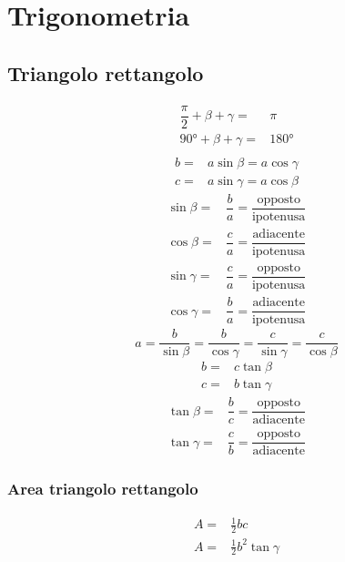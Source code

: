\chapter{Trigonometria}
\section{Triangolo rettangolo}
\begin{center}
	
\end{center}
\begin{align*}
\dfrac{\pi}{2}+\beta+\gamma=&\pi\\
\ang{90}+\beta+\gamma=&\ang{180}\\
\end{align*}
\begin{align*}
b=&a\sin\beta=a\cos\gamma\\
c=&a\sin\gamma=a\cos\beta
\end{align*}
\begin{align*}
\sin\beta=&\dfrac{b}{a}=\dfrac{\text{opposto}}{\text{ipotenusa}}\\
\cos\beta=&\dfrac{c}{a}=\dfrac{\text{adiacente}}{\text{ipotenusa}}\\
\sin\gamma=&\dfrac{c}{a}=\dfrac{\text{opposto}}{\text{ipotenusa}}\\
\cos\gamma=&\dfrac{b}{a}=\dfrac{\text{adiacente}}{\text{ipotenusa}}
\end{align*}
\begin{equation*}
a=\dfrac{b}{\sin\beta}=\dfrac{b}{\cos\gamma}=\dfrac{c}{\sin\gamma}=\dfrac{c}{\cos\beta}
\end{equation*}
\begin{align*}
b=&c\tan\beta\\
c=&b\tan\gamma
\end{align*}
\begin{align*}
\tan\beta=&\dfrac{b}{c}=\dfrac{\text{opposto}}{\text{adiacente}}\\
\tan\gamma=&\dfrac{c}{b}=\dfrac{\text{opposto}}{\text{adiacente}}
\end{align*}
\subsection{Area triangolo rettangolo}
\begin{align*}
A=&\frac{1}{2}bc\\
A=&\frac{1}{2}b^2\tan\gamma\\
\end{align*}
